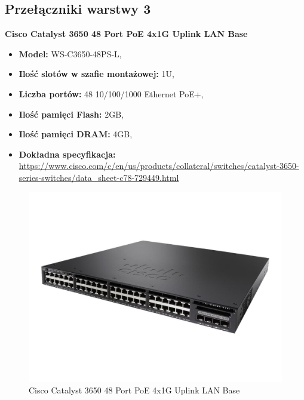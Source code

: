 \documentclass[12pt,a4paper,titlepage]{article}
\begin{document}
\subsection{Przełączniki warstwy 3}
\textbf{Cisco Catalyst 3650 48 Port PoE 4x1G Uplink LAN Base}
\begin{itemize}
    \item \textbf{Model:} WS-C3650-48PS-L,
    \item \textbf{Ilość slotów w szafie montażowej:} 1U,
    \item \textbf{Liczba portów:} 48 10/100/1000 Ethernet PoE+,
    \item \textbf{Ilość pamięci Flash:} 2GB,
    \item \textbf{Ilość pamięci DRAM:} 4GB,
    \item \textbf{Dokładna specyfikacja:}  \url{https://www.cisco.com/c/en/us/products/collateral/switches/catalyst-3650-series-switches/data_sheet-c78-729449.html}
\end{itemize}
\begin{figure}[H]
  \centering
    \includegraphics[width=14cm]{images/switch3.jpg}
    \caption{Cisco Catalyst 3650 48 Port PoE 4x1G Uplink LAN Base}
    \label{fig:switch3}
\end{figure}

\newpage
\end{document}
